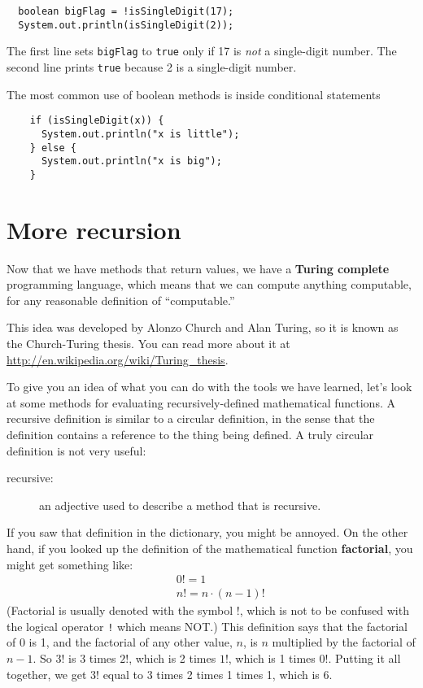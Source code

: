 \documentclass[12pt]{book}
\theoremstyle{definition}
\begin{document}
\begin{lstlisting}
  boolean bigFlag = !isSingleDigit(17);
  System.out.println(isSingleDigit(2));
\end{lstlisting}
%
The first line sets {\tt bigFlag} to {\tt true}
only if 17 is {\em not} a single-digit number.  The second
line prints {\tt true} because 2 is a single-digit number.

The most common use of boolean methods is inside conditional
statements

\begin{lstlisting}
    if (isSingleDigit(x)) {
      System.out.println("x is little");
    } else {
      System.out.println("x is big");
    }
\end{lstlisting}


\section {More recursion}
\label{factorial}

Now that we have methods that return values, we have a {\bf Turing
  complete} programming language, which means that we can compute
anything computable, for any reasonable definition of ``computable.''

This idea was developed by Alonzo Church and Alan Turing, so it is
known as the Church-Turing thesis.  You can read more about it at
\url{http://en.wikipedia.org/wiki/Turing_thesis}.

To give you an idea of what you can do with the tools we have learned,
let's look at some methods for evaluating recursively-defined
mathematical functions.  A recursive definition is similar to a
circular definition, in the sense that the definition contains a
reference to the thing being defined.  A truly circular definition is
not very useful:

\begin{description}

\item[recursive:] an adjective used to describe a method that is recursive.

\end{description}

If you saw that definition in the dictionary, you might be
annoyed.  On the other hand, if you looked up the definition
of the mathematical function {\bf factorial}, you might
get something like:
%
\begin{eqnarray*}
&&  0! = 1 \\
&&  n! = n \cdot(n-1)!
\end{eqnarray*}
%
(Factorial is usually denoted with the symbol $!$, which is
not to be confused with the logical operator {\tt !} which
means NOT.)  This definition says that the factorial of 0 is 1,
and the factorial of any other value, $n$, is $n$ multiplied
by the factorial of $n-1$.  So $3!$ is 3 times $2!$, which is 2 times
$1!$, which is 1 times $0!$.  Putting it all together, we get
$3!$ equal to 3 times 2 times 1 times 1, which is 6.
\end{document}
